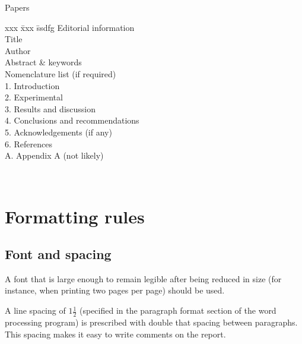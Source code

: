 \documentclass[a5paper, 10pt]{article}
\begin{document}
\begin{table}[htbp]
\begin{centering}
\begin{boxedminipage}[t]{0.4\textwidth}
 \begin{spacing}{1.8}
  \begin{centering}Papers\\\end{centering}
    \begin{tabbing}
      xxx \= xxx \= ssdfg \kill
      Editorial information                  \\
          \> Title                           \\
          \> Author                          \\         
          \> Abstract \& keywords            \\
          \> Nomenclature list (if required) \\
      1.  \> Introduction                    \\
      2.  \> Experimental                    \\
      3.  \> Results and discussion          \\
      4.  \> Conclusions and recommendations \\
      5.  \> Acknowledgements  (if any)      \\
      6.  \> References                      \\
      A.  \> Appendix A  (not likely)        
    \end{tabbing}
  \end{spacing}
\end{boxedminipage}\\
\end{centering}
\end{table}

\section{Formatting rules}
\subsection{Font and spacing}
A font that is large enough to remain legible after being reduced in
size (for instance, when printing two pages per page) should be used.

A line spacing of $1\frac{1}{2}$ (specified in the 
paragraph format section of the word processing program) is prescribed
with double that spacing between paragraphs.  
This spacing makes it easy to write comments on the report.
\end{document}

